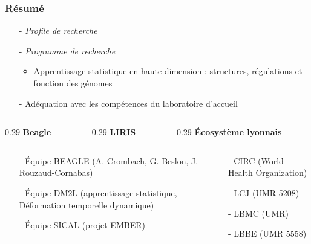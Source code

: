 \documentclass[11pt,xcolor=dvipsnames]{beamer}
\begin{document}
\begin{frame}
\frametitle{Résumé}
\begin{itemize}
\small
\item[-] {\em Profile de recherche}
\item[-] {\em Programme de recherche} \\
\begin{itemize}
\item Apprentissage statistique en haute dimension : structures,
régulations et fonction des génomes
\end{itemize}
\item[-] Adéquation avec les compétences du laboratoire d'accueil
\end{itemize}

\begin{columns}
\begin{column}
{0.29\linewidth}
\tiny
{\bf Beagle}
\end{column}
\begin{column}
{0.29\linewidth}
\tiny
{\bf LIRIS}
\end{column}
\begin{column}
{0.29\linewidth}
\tiny
{\bf Écosystème lyonnais}
\end{column}

\end{columns}
\begin{columns}
\tiny
\begin{column}{0.49\linewidth}
\begin{itemize}[leftmargin=*]
\item[-] Équipe BEAGLE (A. Crombach, G. Beslon, J. Rouzaud-Cornabas)
\item[-] Équipe DM2L (apprentissage statistique, Déformation temporelle
dynamique)  
\item[-] Équipe SICAL (projet EMBER)
\end{itemize}
\end{column}

\begin{column}{0.49\linewidth}
\begin{itemize}[leftmargin=*]
\item[-] CIRC (World Health Organization)
\item[-] LCJ (UMR 5208)
\item[-] LBMC (UMR)
\item[-] LBBE (UMR 5558)
\end{itemize}
\end{column}
\end{columns}


\end{frame}
\end{document}
